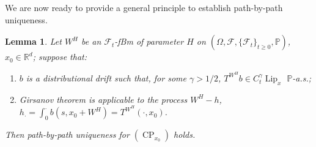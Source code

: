\documentclass[10pt]{article}
\newcommand{\tmop}[1]{\ensuremath{\operatorname{#1}}}
\newenvironment{enumeratenumeric}{\begin{enumerate}[1.] }{\end{enumerate}}
\newtheorem{lemma}{Lemma}
\begin{document}
We are now ready to provide a general principle to establish
path\mbox{-}by\mbox{-}path uniqueness.

\begin{lemma}
  \label{sec4.2.3 criterion path-by-path uniqueness}Let $W^H$ be an
  $\mathcal{F}_t$-fBm of parameter $H$ on $(\Omega, \mathcal{F}, \{
  \mathcal{F}_t \}_{t \geqslant 0}, \mathbb{P})$, $x_0 \in \mathbb{R}^d$;
  suppose that:
  \begin{enumeratenumeric}
    \item $b$ is a distributional drift such that, for some $\gamma > 1 / 2$,
    $T^{W^H} b \in C^{\gamma}_t \tmop{Lip}_x$ $\mathbb{P}$\mbox{-}a.s.;
    
    \item Girsanov theorem is applicable to the process $W^H - h$, $h_{\cdot}
    = \int_0^{\cdot} b (s, x_0 + W^H) = T^{W^H} (\cdot, x_0)$.
  \end{enumeratenumeric}
  Then path\mbox{-}by\mbox{-}path uniqueness for $(\tmop{CP}_{x_0})$ holds.
\end{lemma}
\end{document}
